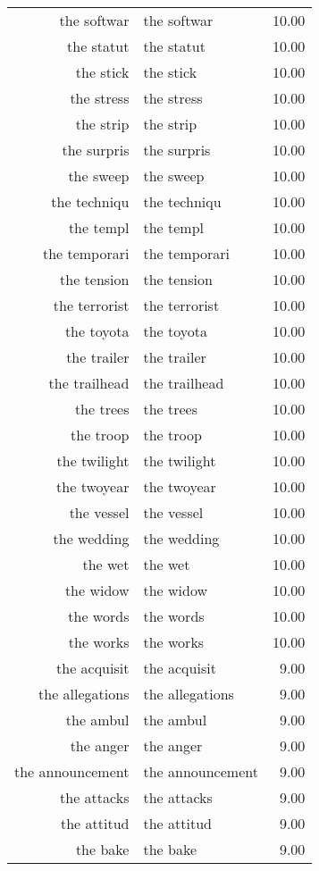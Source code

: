 \begin{table}[ht]
\begin{tabular}{rlr}
  the softwar & the softwar & 10.00 \\ 
  the statut & the statut & 10.00 \\ 
  the stick & the stick & 10.00 \\ 
  the stress & the stress & 10.00 \\ 
  the strip & the strip & 10.00 \\ 
  the surpris & the surpris & 10.00 \\ 
  the sweep & the sweep & 10.00 \\ 
  the techniqu & the techniqu & 10.00 \\ 
  the templ & the templ & 10.00 \\ 
  the temporari & the temporari & 10.00 \\ 
  the tension & the tension & 10.00 \\ 
  the terrorist & the terrorist & 10.00 \\ 
  the toyota & the toyota & 10.00 \\ 
  the trailer & the trailer & 10.00 \\ 
  the trailhead & the trailhead & 10.00 \\ 
  the trees & the trees & 10.00 \\ 
  the troop & the troop & 10.00 \\ 
  the twilight & the twilight & 10.00 \\ 
  the twoyear & the twoyear & 10.00 \\ 
  the vessel & the vessel & 10.00 \\ 
  the wedding & the wedding & 10.00 \\ 
  the wet & the wet & 10.00 \\ 
  the widow & the widow & 10.00 \\ 
  the words & the words & 10.00 \\ 
  the works & the works & 10.00 \\ 
  the acquisit & the acquisit & 9.00 \\ 
  the allegations & the allegations & 9.00 \\ 
  the ambul & the ambul & 9.00 \\ 
  the anger & the anger & 9.00 \\ 
  the announcement & the announcement & 9.00 \\ 
  the attacks & the attacks & 9.00 \\ 
  the attitud & the attitud & 9.00 \\ 
  the bake & the bake & 9.00 \\ 

\end{tabular}
\end{table}
